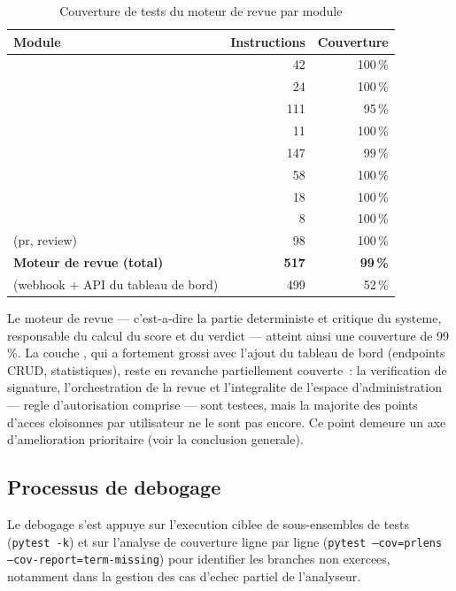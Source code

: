 \documentclass[a4paper,12pt,oneside]{report}
\newcommand{\tablesetup}{\small\singlespacing\renewcommand{\arraystretch}{1.25}}
\begin{document}
\begin{table}[H]
\centering
\tablesetup
\begin{tabular}{L{8.2cm}r@{\hskip 1.4cm}r}
\toprule
\textbf{Module} & \textbf{Instructions} & \textbf{Couverture} \\
\midrule
{} & 42 & 100\,\% \\
 & 24 & 100\,\% \\
 & 111 & 95\,\% \\
 & 11 & 100\,\% \\
 & 147 & 99\,\% \\
 & 58 & 100\,\% \\
 & 18 & 100\,\% \\
 & 8 & 100\,\% \\
 (pr, review) & 98 & 100\,\% \\
\midrule
\textbf{Moteur de revue (total)} & \textbf{517} & \textbf{99\,\%} \\
 (webhook + API du tableau de bord) & 499 & 52\,\% \\
\bottomrule
\end{tabular}
\caption{Couverture de tests du moteur de revue par module}
\label{tab:coverage}
\end{table}

Le moteur de revue --- c'est-a-dire la partie deterministe et critique du systeme, responsable du calcul du score et du verdict --- atteint ainsi une couverture de 99\,\%. La couche , qui a fortement grossi avec l'ajout du tableau de bord (endpoints CRUD, statistiques), reste en revanche partiellement couverte~: la verification de signature, l'orchestration de la revue et l'integralite de l'espace d'administration --- regle d'autorisation comprise --- sont testees, mais la majorite des points d'acces  cloisonnes par utilisateur ne le sont pas encore. Ce point demeure un axe d'amelioration prioritaire (voir la conclusion generale).

\subsection{Processus de debogage}

Le debogage s'est appuye sur l'execution ciblee de sous-ensembles de tests (\texttt{pytest -k}) et sur l'analyse de couverture ligne par ligne (\texttt{pytest --cov=prlens --cov-report=term-missing}) pour identifier les branches non exercees, notamment dans la gestion des cas d'echec partiel de l'analyseur.
\end{document}

